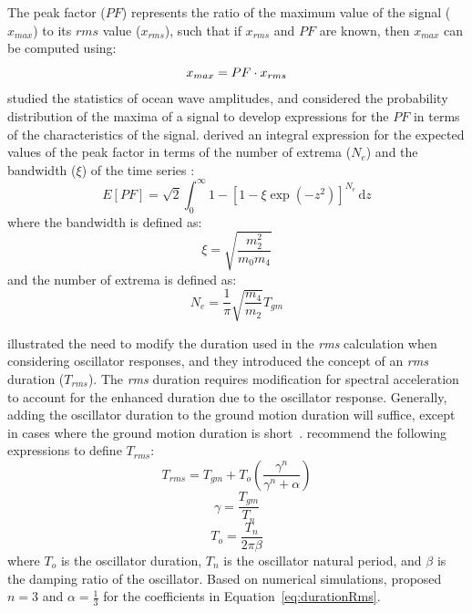 \documentclass[12pt,oneside]{book}
\newcommand{\ud}{\,\mathrm{d}}
\begin{document}
The peak factor ($PF$) represents the ratio of the maximum value of the signal ($x_{max}$) to its
$rms$ value ($x_{rms}$), such that if $x_{rms}$ and $PF$ are known, then $x_{max}$ can be computed
using:
\begin{equation}
    x_{max} = PF \cdot x_{rms}
    \label{eq:rvt:max}
    \index{random vibration theory!peak factor}
\end{equation}
\citet{cartwright:56} studied the statistics of ocean wave amplitudes, and considered the
probability distribution of the maxima of a signal to develop expressions for the $PF$ in terms of
the characteristics of the signal.  \citet{cartwright:56} derived an integral expression for the
expected values of the peak factor in terms of the number of extrema ($N_e$) and the bandwidth
($\xi$) of the time series \citep{boore:03}:
\begin{equation}
    E[PF] = \sqrt{2} \int_0^{\infty} 1 - \left[ 1 - \xi\exp\left( -z^2 \right) \right]^{N_e} \ud z
    \label{eq:rvt:peakFactor}
\end{equation}
where the bandwidth is defined as:
\begin{equation}
    \xi = \sqrt{\frac{m_2^2}{m_0 m_4}}
    \label{eq:rvt:bandWidth}
\end{equation}
and the number of extrema is defined as:
\begin{equation}
    N_e = \frac{1}{\pi} \sqrt{\frac{m_4}{m_2}} T_{gm}
    \label{eq:rvt:numExtrema}
\end{equation}

\citet{boore:84} illustrated the need to modify the duration used in the \emph{rms} calculation when
considering oscillator responses, and they introduced the concept of an \emph{rms} duration
($T_{rms}$).  The \emph{rms} duration requires modification for spectral acceleration to account for
the enhanced duration due to the oscillator response.  Generally, adding the oscillator duration to
the ground motion duration will suffice, except in cases where the ground motion duration is
short~\citep{boore:84}.  \citet{boore:84} recommend the following expressions to define $T_{rms}$:
\begin{equation}
    T_{rms} = T_{gm} + T_o \left( \frac{\gamma^n}{\gamma^n + \alpha} \right)
    \label{eq:durationRms}
\end{equation}
\begin{equation}
    \gamma = \frac{T_{gm}}{T_n}
\end{equation}
\begin{equation}
    T_o = \frac{T_n}{2\pi\beta}
\end{equation}
where $T_o$ is the oscillator duration, $T_n$ is the oscillator natural period, and $\beta$ is the
damping ratio of the oscillator.  Based on numerical simulations, \citet{boore:84} proposed $n=3$
and $\alpha=\frac{1}{3}$ for the coefficients in Equation~\ref{eq:durationRms}.
\end{document}
